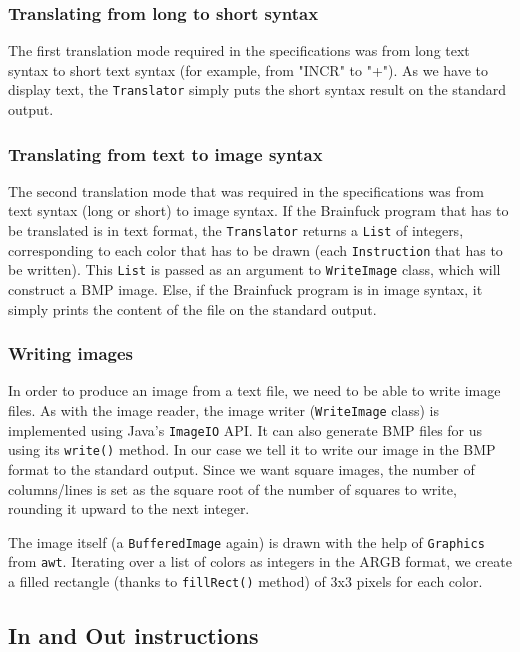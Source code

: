 \documentclass{article}
\begin{document}
\subsubsection{Translating from long to short syntax}

The first translation mode required in the specifications was from long text syntax to short text syntax (for example, from "INCR" to "+"). As we have to display text, the \texttt{Translator} simply puts the short syntax result on the standard output.

\subsubsection{Translating from text to image syntax}

The second translation mode that was required in the specifications was from text syntax (long or short) to image syntax. If the Brainfuck program that has to be translated is in text format, the \texttt{Translator} returns a \texttt{List} of integers, corresponding to each color that has to be drawn (each \texttt{Instruction} that has to be written). This \texttt{List} is passed as an argument to \texttt{WriteImage} class, which will construct a BMP image. Else, if the Brainfuck program is in image syntax, it simply prints the content of the file on the standard output.

\subsubsection{Writing images}

In order to produce an image from a text file, we need to be able to write image files. As with the image reader, the image writer (\texttt{WriteImage} class) is implemented using Java's \texttt{ImageIO} API. It can also generate BMP files for us using its \texttt{write()} method. In our case we tell it to write our image in the BMP format to the standard output. Since we want square images, the number of columns/lines is set as the square root of the number of squares to write, rounding it upward to the next integer.

The image itself (a \texttt{BufferedImage} again) is drawn with the help of \texttt{Graphics} from \texttt{awt}. Iterating over a list of colors as integers in the ARGB format, we create a filled rectangle (thanks to \texttt{fillRect()} method) of 3x3 pixels for each color.

\subsection{In and Out instructions}
\end{document}
